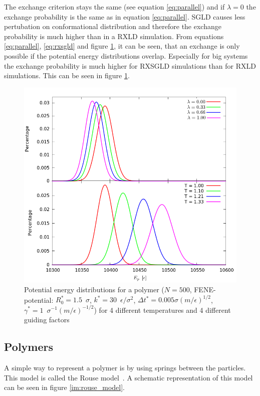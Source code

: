 \documentclass[a4paper]{article}
\begin{document}
The exchange criterion stays the same (see equation \ref{eq:parallel}) and if $\lambda = 0$ the exchange probability is the same as in equation \ref{eq:parallel}. SGLD causes less pertubation on conformational distribution and therefore the exchange probability is much higher than in a RXLD simulation. From equations \ref{eq:parallel}, \ref{eq:rxsgld} and figure \ref{im:distributions}, it can be seen, that an exchange is only possible if the potential energy distributions overlap. Especially for big systems the exchange probability is much higher for RXSGLD simulations than for RXLD simulations. This can be seen in figure \ref{im:distributions}.

\begin{figure} [H]
\centering
\includegraphics[width=400pt]{distributions.png}
\caption{Potential energy distributions for a polymer ($N = 500$, FENE-potential: $R_0^* = 1.5 \enspace \sigma$, $k^* = 30 \enspace \epsilon/\sigma^2$, $\Delta t^* = 0.005 \sigma (m/\epsilon)^{1/2}$, $\gamma^* = 1 \enspace \sigma^{-1} (m/\epsilon)^{-1/2}$) for 4 different temperatures and 4 different guiding factors}
\label{im:distributions}
\end{figure}

\subsection{Polymers}

A simple way to represent a polymer is by using springs between the particles. This model is called the Rouse model~\cite{Rouse1953}. A schematic representation of this model can be seen in figure \ref{im:rouse_model}.
\end{document}
